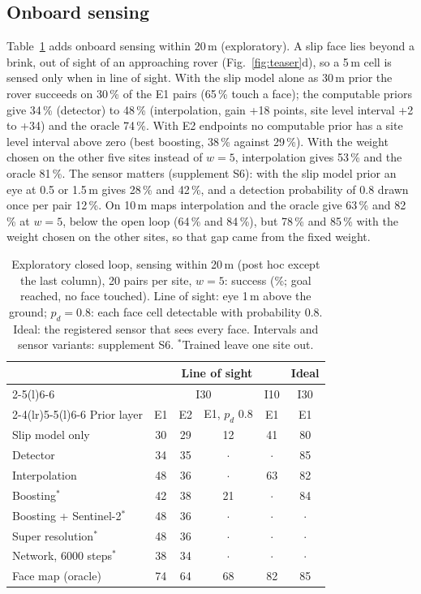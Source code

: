 \documentclass[conference]{IEEEtran}
\begin{document}
\subsection{Onboard sensing}
Table~\ref{tab:closedloop} adds onboard sensing within 20\,m (exploratory). A slip face lies beyond a brink, out of sight of an approaching rover (Fig.~\ref{fig:teaser}d), so a 5\,m cell is sensed only when in line of sight. With the slip model alone as 30\,m prior the rover succeeds on 30\,\% of the E1 pairs (65\,\% touch a face); the computable priors give 34\,\% (detector) to 48\,\% (interpolation, gain +18 points, site level interval +2 to +34) and the oracle 74\,\%. With E2 endpoints no computable prior has a site level interval above zero (best boosting, 38\,\% against 29\,\%). With the weight chosen on the other five sites instead of $w=5$, interpolation gives 53\,\% and the oracle 81\,\%. The sensor matters (supplement S6): with the slip model prior an eye at 0.5 or 1.5\,m gives 28\,\% and 42\,\%, and a detection probability of 0.8 drawn once per pair 12\,\%. On 10\,m maps interpolation and the oracle give 63\,\% and 82\,\% at $w=5$, below the open loop (64\,\% and 84\,\%), but 78\,\% and 85\,\% with the weight chosen on the other sites, so that gap came from the fixed weight.

\begin{table}[t]
\caption{Exploratory closed loop, sensing within 20\,m (post hoc except the last column), 20 pairs per site, $w=5$: success (\%; goal reached, no face touched). Line of sight: eye 1\,m above the ground; $p_d=0.8$: each face cell detectable with probability 0.8. Ideal: the registered sensor that sees every face. Intervals and sensor variants: supplement S6. $^{*}$Trained leave one site out.}
\label{tab:closedloop}
\centering\scriptsize
\setlength{\tabcolsep}{2.6pt}
\begin{tabular}{@{}lccccc@{}}
\toprule
 & \multicolumn{4}{c}{Line of sight} & Ideal \\
\cmidrule(lr){2-5}\cmidrule(l){6-6}
 & \multicolumn{3}{c}{I30} & I10 & I30 \\
\cmidrule(lr){2-4}\cmidrule(lr){5-5}\cmidrule(l){6-6}
Prior layer & E1 & E2 & E1, $p_d$ 0.8 & E1 & E1 \\
\midrule
Slip model only & 30 & 29 & 12 & 41 & 80 \\
Detector & 34 & 35 & $\cdot$ & $\cdot$ & 85 \\
Interpolation & 48 & 36 & $\cdot$ & 63 & 82 \\
Boosting$^{*}$ & 42 & 38 & 21 & $\cdot$ & 84 \\
Boosting + Sentinel-2$^{*}$ & 48 & 36 & $\cdot$ & $\cdot$ & $\cdot$ \\
Super resolution$^{*}$ & 48 & 36 & $\cdot$ & $\cdot$ & $\cdot$ \\
Network, 6000 steps$^{*}$ & 38 & 34 & $\cdot$ & $\cdot$ & $\cdot$ \\
Face map (oracle) & 74 & 64 & 68 & 82 & 85 \\
\bottomrule
\end{tabular}
\end{table}
\end{document}
